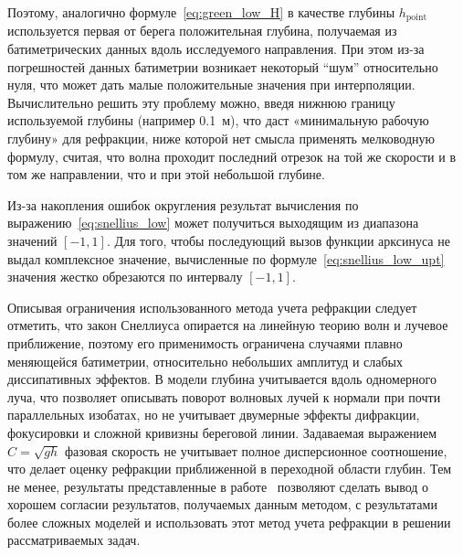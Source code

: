 Поэтому, аналогично формуле~\eqref{eq:green_low_H} в качестве глубины $h_\text{point}$ используется первая от берега положительная глубина, получаемая из батиметрических данных вдоль исследуемого направления.
При этом из-за погрешностей данных батиметрии возникает некоторый \enquote{шум} относительно нуля, что может дать малые положительные значения при интерполяции.
Вычислительно решить эту проблему можно, введя нижнюю границу используемой глубины (например 0.1~м), что даст «минимальную рабочую глубину» для рефракции, ниже которой нет смысла применять мелководную формулу, считая, что волна проходит последний отрезок на той же скорости и в том же направлении, что и при этой небольшой глубине.

Из-за накопления ошибок округления результат вычисления по выражению~\eqref{eq:snellius_low} может получиться выходящим из диапазона значений $[-1, 1]$. 
Для того, чтобы последующий вызов функции арксинуса не выдал комплексное значение, вычисленные по формуле~\eqref{eq:snellius_low_upt} значения жестко обрезаются по интервалу $[-1, 1]$.

Описывая ограничения использованного метода учета рефракции следует отметить, что закон Снеллиуса опирается на линейную теорию волн и лучевое приближение, поэтому его применимость ограничена случаями плавно меняющейся батиметрии, относительно небольших амплитуд и слабых диссипативных эффектов. 
В модели глубина учитывается вдоль одномерного луча, что позволяет описывать поворот волновых лучей к нормали при почти параллельных изобатах, но не учитывает двумерные эффекты дифракции, фокусировки и сложной кривизны береговой линии. 
Задаваемая выражением $C = \sqrt{g h}$ фазовая скорость не учитывает полное дисперсионное соотношение, что делает оценку рефракции приближенной в переходной области глубин. 
Тем не менее, результаты представленные в работе~\cite{LopezRuiz2015_wave_refraction} позволяют сделать вывод о хорошем согласии результатов, получаемых данным методом, с результатами более сложных моделей и использовать этот метод учета рефракции в решении рассматриваемых задач.
